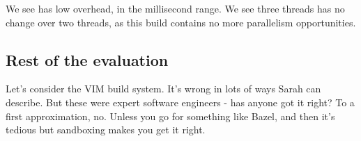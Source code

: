 We see \Rattle has low overhead, in the millisecond range. We see three threads has no change over two threads, as this build contains no more parallelism opportunities.

\subsection{Rest of the evaluation}

Let's consider the VIM build system. It's wrong in lots of ways Sarah can describe. But these were expert software engineers - has anyone got it right? To a first approximation, no. Unless you go for something like Bazel, and then it's tedious but sandboxing makes you get it right.
